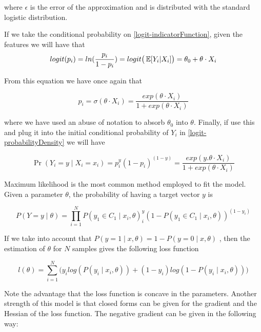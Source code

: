 where $\epsilon$ is the error of the approximation and is distributed with the standard logistic distribution. %

If we take the conditional probability on \ref{logit-indicatorFunction}, given the features we will have that
\begin{equation}
logit(p_i)= ln(\frac{p_i}{1-p_i}) = logit\big( \operatorname{\mathbb{E}}[Y_i| X_i] \big) = \theta_0 + \theta \cdot X_i
\end{equation}

From this equation we have once again that

\begin{equation}
p_i = \sigma(\theta \cdot X_i) = \frac{exp(\theta \cdot X_i) }{1 + exp(\theta \cdot X_i)}
\end{equation}

where we have used an abuse of notation to absorb $\theta_0$ into $\theta$. Finally, if use this and plug it into the initial conditional probability of $Y_i$ in \ref{logit-probabilityDensity} we will have

\begin{equation}
 \Pr(Y_i=y \mid X_i = x_i) =  p_i^{y} (1-p_i)^{(1-y)} = \frac{exp(y . \theta \cdot X_i) }{1 + exp(\theta \cdot X_i)}
 \end{equation}


Maximum likelihood is the most common method employed to fit the model. %
Given a parameter $\theta$, the probability of having a target vector $y$ is

\begin{equation}
P(Y =y \mid \theta )  = \prod_{i=1}^N P(y_1 \in C_1 \mid x_i, \theta)^y_i(1 - P(y_1 \in C_1 \mid x_i, \theta) )^{(1-y_i)}
\end{equation}

If we take into account that $P(y=1 \mid x,\theta) = 1 - P(y=0 \mid x,\theta)$ , then the estimation of $\theta$ for $N$ samples gives the following loss function

\begin{equation}
l(\theta) = \sum_{i=1}^N \big(y_i log(P(y_i \mid x_i,\theta)) + (1-y_i)log(1 - P(y_i \mid x_i,\theta) ) \big)
\end{equation}

Note the advantage that the loss function is concave in the parameters. Another strength of this model is that closed forms can be given for the gradient and the Hessian of the loss function. The negative gradient can be given in the following way: %

